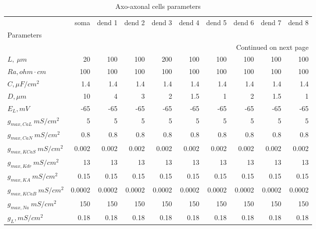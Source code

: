 \begin{longtable}{lrrrrrrrrr}
\caption{Axo-axonal cells parameters}\label{ca1_aac_cell_parameters}\\
\toprule
{} &   soma & dend 1 & dend 2 & dend 3 & dend 4 & dend 5 & dend 6 & dend 7 & dend 8 \\
Parameters      &        &        &        &        &        &        &        &        &        \\
\midrule
\endhead
\midrule
\multicolumn{10}{r}{{Continued on next page}} \\
\midrule
\endfoot

\bottomrule
\endlastfoot
$L, \ \mu m$ &     20 &    100 &    100 &    200 &    100 &    100 &    100 &    100 &    100 \\
$Ra,
 ohm \cdot cm$              &    100 &    100 &    100 &    100 &    100 &    100 &    100 &    100 &    100 \\
$C, \mu F / cm^2$              &    1.4 &    1.4 &    1.4 &    1.4 &    1.4 &    1.4 &    1.4 &    1.4 &    1.4 \\
$D, \mu m$            &     10 &      4 &      3 &      2 &    1.5 &      1 &      2 &    1.5 &      1 \\
$E_L,  mV$       &    -65 &    -65 &    -65 &    -65 &    -65 &    -65 &    -65 &    -65 &    -65 \\
$g_{max, CaL    }\  mS / cm^2$&      5 &      5 &      5 &      5 &      5 &      5 &      5 &      5 &      5 \\
$g_{max, CaN    }\  mS / cm^2$&    0.8 &    0.8 &    0.8 &    0.8 &    0.8 &    0.8 &    0.8 &    0.8 &    0.8 \\
$g_{max, KCaS    }\  mS / cm^2$&  0.002 &  0.002 &  0.002 &  0.002 &  0.002 &  0.002 &  0.002 &  0.002 &  0.002 \\
$g_{max, Kdr }\  mS / cm^2$&     13 &     13 &     13 &     13 &     13 &     13 &     13 &     13 &     13 \\
$g_{max, KA     }\  mS / cm^2$&   0.15 &   0.15 &   0.15 &   0.15 &   0.15 &   0.15 &   0.15 &   0.15 &   0.15 \\
$g_{max, KCaB   }\  mS / cm^2$& 0.0002 & 0.0002 & 0.0002 & 0.0002 & 0.0002 & 0.0002 & 0.0002 & 0.0002 & 0.0002 \\
$g_{max, Na     }\  mS / cm^2$&    150 &    150 &    150 &    150 &    150 &    150 &    150 &    150 &    150 \\
$g_L,  mS / cm^2$    &   0.18 &   0.18 &   0.18 &   0.18 &   0.18 &   0.18 &   0.18 &   0.18 &   0.18 \\
\end{longtable}
